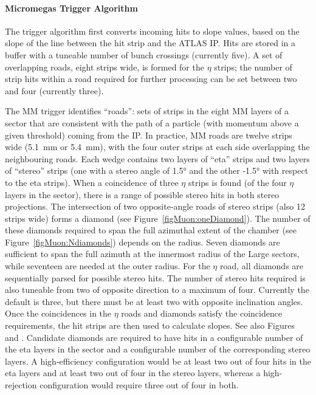 \documentclass[cernpreprint, atlasdraft=false, UKenglish,british,orcidlogo, texmf, orcidlogo]{atlasdoc}
\begin{document}
 
\paragraph{Micromegas Trigger Algorithm \label{tdaq:MMtrigger}}
The \MM trigger algorithm first converts incoming hits to slope values, based on the slope of the line between the hit strip and the ATLAS \gls{IP}.
Hits are stored in a buffer with a tuneable number of bunch crossings (currently five). A set of overlapping roads, eight strips wide, is formed for the $\eta$ strips;
the number of strip hits within a road required for further processing can be set between two and four (currently three).
 
The \gls{MM} trigger identifies ``roads'': sets of strips in the eight \gls{MM} layers of a sector that are consistent with the path of a particle (with momentum above a given threshold) coming from the \gls{IP}.
In practice, \gls{MM} roads are twelve strips wide (\SI{5.1}{\mm} or \SI{5.4}{\mm}), with the four outer strips at each side overlapping the neighbouring roads.
Each wedge contains two layers of ``eta'' strips and two layers of ``stereo'' strips (one with a stereo angle of \ang{1.5} and the other \ang{-1.5} with respect to the eta strips).
When a coincidence of three $\eta$ strips is found (of the four $\eta$ layers in the sector), there is a range of possible stereo hits in both stereo projections.
The intersection of two opposite-angle roads of stereo strips (also \num{12} strips wide) forms a diamond (see Figure~\ref{figMuon:oneDiamond}).
The number of these diamonds required to span the full azimuthal extent of the chamber (see Figure~\ref{figMuon:Ndiamonds}) depends on the radius.
Seven diamonds are sufficient to span the full azimuth at the innermost radius of the Large sectors, while seventeen are needed at the outer radius.
For the $\eta$ road, all diamonds are sequentially parsed for possible stereo hits. The number of stereo hits required is also tuneable from two of opposite direction to a maximum of four.  Currently the default is three, but there must be at least two with opposite inclination angles. Once the coincidences in the $\eta$ roads and diamonds satisfy the coincidence requirements, the hit strips are then used to calculate slopes. See also Figures~\protect{} and \protect{}.
Candidate diamonds are required to have hits in a configurable number of the eta layers in the sector and a configurable number of the corresponding stereo layers.
A high-efficiency configuration would be at least two out of four hits in the eta layers and at least two out of four in the stereo layers, whereas a high-rejection configuration would require three out of four in both.
\end{document}
